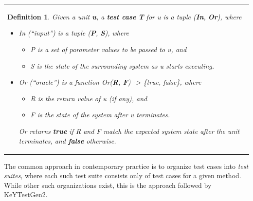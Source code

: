 \documentclass{article}
\newcommand{\tmem}[1]{{\em #1\/}}
\newcommand{\tmstrong}[1]{\textbf{#1}}
\newcommand{\tmtextbf}[1]{{\bfseries{#1}}}
\newenvironment{itemizeminus}{\begin{itemize} \renewcommand{\labelitemi}{$-$}\renewcommand{\labelitemii}{$-$}\renewcommand{\labelitemiii}{$-$}\renewcommand{\labelitemiv}{$-$}}{\end{itemize}}
\newenvironment{tmparmod}[3]{\begin{list}{}{\setlength{\topsep}{0pt}\setlength{\leftmargin}{#1}\setlength{\rightmargin}{#2}\setlength{\parindent}{#3}\setlength{\listparindent}{\parindent}\setlength{\itemindent}{\parindent}\setlength{\parsep}{\parskip}} \item[]}{\end{list}}
\newtheorem{definition}{Definition}
{\theorembodyfont{\rmfamily}\newtheorem{example}{Example}}
\begin{document}
\begin{tmparmod}{1cm}{0pt}{0pt}
  \begin{tmparmod}{0pt}{1cm}{0pt}
    {\noindent}{\noindent}\begin{tabular}{l}
      \begin{definition}
        
        
        
        
        Given a unit {\tmem{{\tmstrong{u}}}}, a \tmtextbf{test case}
        {\tmem{{\tmstrong{T}} }}for {\tmem{u}} is a tuple
        ({\tmstrong{{\tmem{In}}}}, {\tmem{{\tmstrong{Or}}}}), where
        \begin{itemize}
          \item In (``input'') is a tuple ({\tmem{{\tmstrong{P}}}},
          {\tmstrong{{\tmem{S}}}}), where
          \begin{itemizeminus}
            \item P is a set of parameter values to be passed to {\tmem{u}},
            and
            
            \item S is the state of the surrounding system as {\tmem{u}}
            starts executing.
          \end{itemizeminus}
          \item Or (``oracle'') is a function
          Or({\tmem{}}{\tmem{{\tmstrong{R{\tmstrong{}}}}}},
          {\tmem{{\tmstrong{F}}}}) -> \{true, false\}, where
          \begin{itemizeminus}
            \item R is the return value of {\tmem{u}} (if any), and
            
            \item F is the state of the system after {\tmem{u}} terminates.
          \end{itemizeminus}
          Or returns {\tmstrong{{\tmem{true}}}} if R and F match the expected
          system state after the unit terminates, and
          {\tmstrong{{\tmem{false}}}} otherwise. 
        \end{itemize}
      \end{definition}
    \end{tabular}{\hspace*{\fill}}{\smallskip}
  \end{tmparmod}
\end{tmparmod}





The common approach in contemporary practice is to organize test cases into
{\tmem{test suites}}, where each such test suite consists only of test cases
for a given method. While other such organizations exist, this is the approach
followed by KeYTestGen2.
\end{document}
